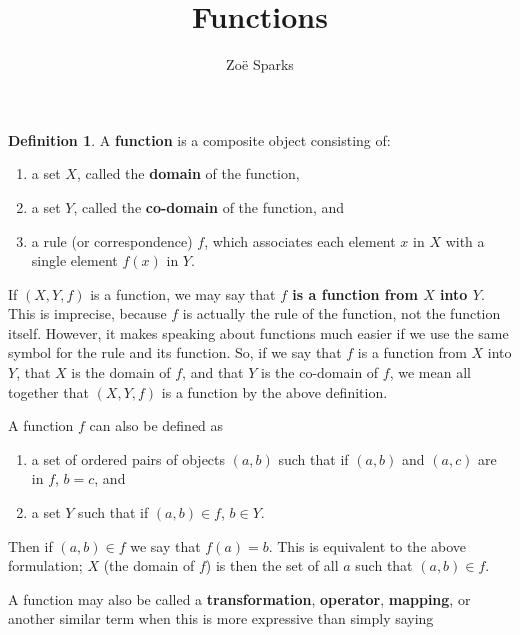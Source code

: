 \documentclass[12pt]{article}
\title{Functions}
\author{Zoë Sparks}
\begin{document}
\theoremstyle{definition}

\newtheorem{thm}{Theorem}
\newtheorem*{nthm}{Theorem}
\newtheorem{sthm}{}[thm]
\newtheorem{lemma}{Lemma}[thm]
\newtheorem*{nlemma}{Lemma}
\newtheorem{cor}{Corollary}[thm]
\newtheorem*{prop}{Property}
\newtheorem*{defn}{Definition}
\newtheorem*{comm}{Comment}
\newtheorem*{exm}{Example}

\maketitle

\begin{defn}
  A \textbf{function} is a composite object consisting of:
  \begin{enumerate}
    \item
      a set $X$, called the \textbf{domain} of the function,
    \item
      a set $Y$, called the \textbf{co-domain} of the function, and
    \item
      a rule (or correspondence) $f$, which associates each element $x$ in $X$ with a
      single element $f(x)$ in $Y$.
  \end{enumerate}

  If $(X,Y,f)$ is a function, we may say that \textbf{$f$ is a function from $X$ into
  $Y$}. This is imprecise, because $f$ is actually the rule of the function, not the
  function itself. However, it makes speaking about functions much easier if we use
  the same symbol for the rule and its function. So, if we say that $f$ is a function
  from $X$ into $Y$, that $X$ is the domain of $f$, and that $Y$ is the co-domain of
  $f$, we mean all together that $(X,Y,f)$ is a function by the above definition.

  A function $f$ can also be defined as
  \begin{enumerate}
    \item
      a set of ordered pairs of objects $(a,b)$ such that if $(a,b)$ and $(a,c)$ are
      in $f$, $b = c$, and
    \item
      a set $Y$ such that if $(a,b) \in f$, $b \in Y$.
  \end{enumerate}
  Then if $(a,b) \in f$ we say that $f(a) = b$. This is equivalent to the above
  formulation; $X$ (the domain of $f$) is then the set of all $a$ such that $(a,b)
  \in f$.

  A function may also be called a \textbf{transformation}, \textbf{operator},
  \textbf{mapping}, or another similar term when this is more expressive than simply
  saying 
\end{defn}
\end{document}
